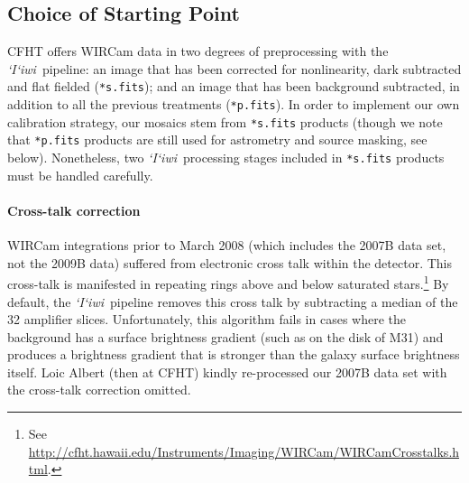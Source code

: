 \documentclass[iop,tighten]{emulateapj}
\newcommand{\sw}[1]{\textit{#1}} %
\newcommand{\iiwione}{\sw{`I`iwi}}
\begin{document}
\subsection{Choice of Starting Point}

CFHT offers WIRCam data in two degrees of preprocessing with the \iiwione\ pipeline: an image that has been corrected for nonlinearity, dark subtracted and flat fielded (\texttt{*s.fits}); and an image that has been background subtracted, in addition to all the previous treatments (\texttt{*p.fits}).
In order to implement our own calibration strategy, our mosaics stem from \texttt{*s.fits} products (though we note that \texttt{*p.fits} products are still used for astrometry and source masking, see below).
Nonetheless, two \iiwione\ processing stages included in \texttt{*s.fits} products must be handled carefully.

\paragraph{Cross-talk correction} WIRCam integrations prior to March 2008 (which includes the 2007B data set, not the 2009B data) suffered from electronic cross talk within the detector.
This cross-talk is manifested in repeating rings above and below saturated stars.\footnote{See \url{http://cfht.hawaii.edu/Instruments/Imaging/WIRCam/WIRCamCrosstalks.html}.}
By default, the \iiwione\ pipeline removes this cross talk by subtracting a median of the 32 amplifier slices.
Unfortunately, this algorithm fails in cases where the background has a surface brightness gradient (such as on the disk of M31) and produces a brightness gradient that is stronger than the galaxy surface brightness itself.
Loic Albert (then at CFHT) kindly re-processed our 2007B data set with the cross-talk correction omitted.
\end{document}

